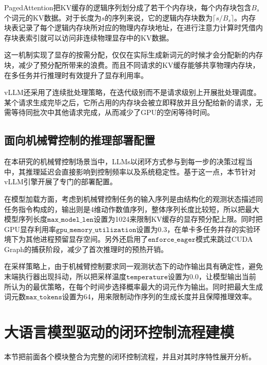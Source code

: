 PagedAttention把KV缓存的逻辑序列划分成了若干个内存块，每个内存块包含$B_s$个词元的KV数据。对于长度为$s$的序列来说，它的逻辑内存块数为$\lceil s / B_s \rceil$。内存块表记录了每个逻辑内存块所对应的物理内存块地址，在进行注意力计算时凭借内存块表索引就可以访问非连续物理显存中的KV数据。

这一机制实现了显存的按需分配，仅仅在实际生成新词元的时候才会分配新的内存块，减少了预分配所带来的浪费。而且不同请求的KV缓存能够共享物理内存块，在多任务并行推理时有效提升了显存利用率。

vLLM还采用了连续批处理策略，在迭代级别而不是请求级别上开展批处理调度。某个请求生成完毕之后，它所占用的内存块会被立即释放并且分配给新的请求，无需等待同批次中其他请求完成，从而减少了GPU的空闲等待时间。

\subsection{面向机械臂控制的推理部署配置}
在本研究的机械臂控制场景当中，LLMs以闭环方式参与到每一步的决策过程当中，其推理延迟会直接影响到控制频率以及系统稳定性。基于这一点，本节针对vLLM引擎开展了专门的部署配置。

在模型加载方面，考虑到机械臂控制任务的输入序列是由结构化的观测状态描述同任务指令构成的，输出则是4维动作数值序列，整体序列长度比较短，所以把最大模型序列长度$\texttt{max\_model\_len}$设置为1024来限制KV缓存的显存预分配上限。同时把GPU显存利用率$\texttt{gpu\_memory\_utilization}$设置为0.3，在单卡多任务并存的实验环境下为其他进程预留显存空间。另外还启用了$\texttt{enforce\_eager}$模式来跳过CUDA Graph的捕获阶段，减少了首次推理时的预热开销。

在采样策略上，由于机械臂控制要求同一观测状态下的动作输出具有确定性，避免末端执行器出现抖动，所以把采样温度$\texttt{temperature}$设置为0.0，让模型输出当前所认为的最优策略，在每个时间步选择概率最大的词元作为输出。同时把最大生成词元数$\texttt{max\_tokens}$设置为64，用来限制动作序列的生成长度并且保障推理效率。


\section{大语言模型驱动的闭环控制流程建模}\label{sec:llm_control-loop}
本节把前面各个模块整合为完整的闭环控制流程，并且对其时序特性展开分析。

